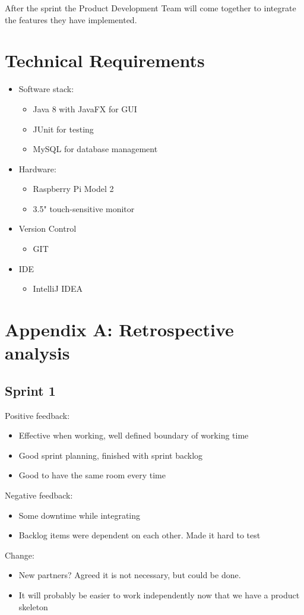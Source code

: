 \documentclass[a4paper,12pt]{article}
\begin{document}
After the sprint the Product Development Team will come together to integrate the features they have implemented.

\section{Technical Requirements}
\begin{itemize}
	\item Software stack:
	\begin{itemize}
		\item Java 8 with JavaFX for GUI
		\item JUnit for testing
		\item MySQL for database management
	\end{itemize}
	\item Hardware:
	\begin{itemize}
		\item Raspberry Pi Model 2
		\item 3.5" touch-sensitive monitor
	\end{itemize}
	\item Version Control
	\begin{itemize}
		\item GIT
	\end{itemize}
	\item IDE
	\begin{itemize}
		\item IntelliJ IDEA
	\end{itemize}
\end{itemize}

\section{Appendix A: Retrospective analysis}
\subsection{Sprint 1}
Positive feedback:
\begin{itemize}
	\item Effective when working, well defined boundary of working time
	\item Good sprint planning, finished with sprint backlog
	\item Good to have the same room every time
\end{itemize}
 Negative feedback:
 \begin{itemize}
 	\item Some downtime while integrating
 	\item Backlog items were dependent on each other. Made it hard to test
 \end{itemize}
 Change:
 \begin{itemize}
 	\item New partners? Agreed it is not necessary, but could be done.
 	\item It will probably be easier to work independently now that we have a product skeleton
 \end{itemize}
\end{document}
